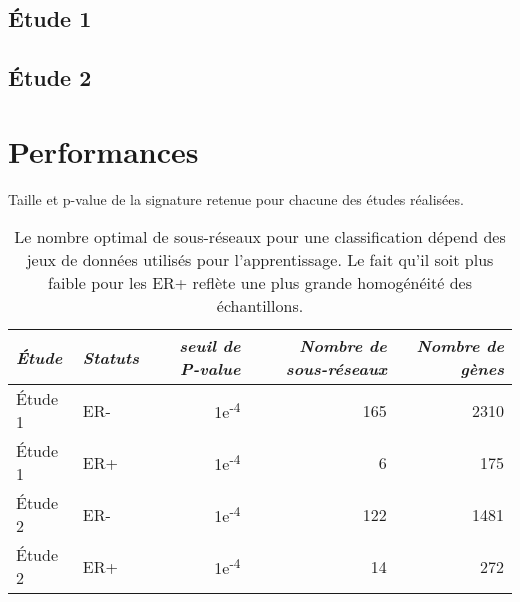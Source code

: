     \subsection{\textcolor{mygreen}{Étude 1}}\label{sec:Study1}

    \subsection{\textcolor{mygreen}{Étude 2}}\label{sec:Study2}

  	\section{\textcolor{mygreen}{Performances}}

        \begin{table}
        \begin{center}
          \caption{Taille et p-value de la signature retenue pour chacune des études réalisées.}
          \begin{tabular}{llrrr}
            \toprule
            \emph{Étude} & \emph{Statuts} & \emph{seuil de P-value} & \emph{Nombre de sous-réseaux} & \emph{Nombre de gènes} \\
            \midrule
            Étude 1      & ER-            & 1e\textsuperscript{-4}  & 165                           & 2310                    \\
            Étude 1      & ER+            & 1e\textsuperscript{-4}  & 6                             & 175                     \\
            Étude 2      & ER-            & 1e\textsuperscript{-4}  & 122                           & 1481                    \\
            Étude 2      & ER+            & 1e\textsuperscript{-4}  & 14                            & 272                     \\
            \bottomrule
          \end{tabular}
          \label{tab:Res2pvalue}
          \vspace{5ex}
          \caption*{Le nombre optimal de sous-réseaux pour une classification dépend des jeux de données utilisés pour l'apprentissage. Le fait qu'il soit plus faible pour les ER+ reflète une plus grande homogénéité des échantillons.}
        \end{center}
      \end{table}

